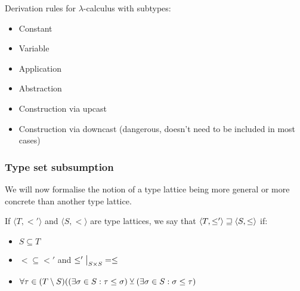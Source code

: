 \documentclass[main.tex]{subfiles}
\begin{document}
\begin{defn}
    \label{def:subtypederiv}
    Derivation rules for $\lambda$-calculus with subtypes:

    \begin{itemize}
        \item Constant
        \item Variable
        \item Application
        \item Abstraction
        \item Construction via upcast
        \item Construction via downcast (dangerous, doesn't need to be included in most cases)
    \end{itemize}
\end{defn}

\subsubsection{Type set subsumption}
We will now formalise the notion of a type lattice being more general
or more concrete than another type lattice.

\begin{defn}
    If $\langle T, \less' \rangle$ and $\langle S, \less \rangle$
    are type lattices, we say that $\langle T, \leq' \rangle \sqsupseteq \langle S, \leq \rangle$ if:
    \begin{itemize}
        \item $S \subseteq T$
        \item $\less \subseteq \less'$ and $\restr{\less'}{S \times S} = \less$
        \item $\forall \tau \in (T \setminus S) ((\exists \sigma \in S : \tau \leq \sigma )
            \veebar (\exists \sigma \in S : \sigma \leq \tau)$
    \end{itemize}
\end{defn}
\end{document}
